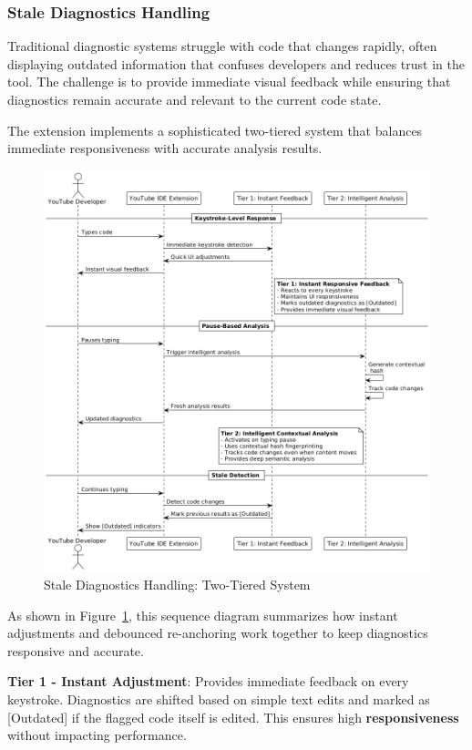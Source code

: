 \begin{spacing}{1.2}
\subsubsection{Stale Diagnostics Handling}
Traditional diagnostic systems struggle with code that changes rapidly, often displaying outdated information that confuses developers and reduces trust in the tool. The challenge is to provide immediate visual feedback while ensuring that diagnostics remain accurate and relevant to the current code state.

The extension implements a sophisticated two-tiered system that balances immediate responsiveness with accurate analysis results.


\begin{figure}[H]
    \centering
    \includegraphics[scale=0.55]{Images/stale_diagnostics.png}
    \caption{Stale Diagnostics Handling: Two-Tiered System}
    \label{fig:stale_diagnostics_method}
\end{figure}

As shown in Figure~\ref{fig:stale_diagnostics_method}, this sequence diagram summarizes how instant adjustments and debounced re-anchoring work together to keep diagnostics responsive and accurate.

\textbf{Tier 1 - Instant Adjustment}: Provides immediate feedback on every keystroke. Diagnostics are shifted based on simple text edits and marked as [Outdated] if the flagged code itself is edited. This ensures high \textbf{responsiveness} without impacting performance.  


\end{spacing}

